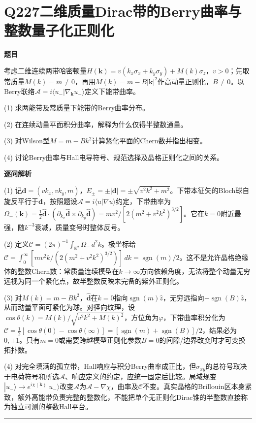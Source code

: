 \documentclass[UTF8,a4paper,11pt,oneside,openany]{ctexbook}
\begin{document}
\section*{Q227\quad 二维质量Dirac带的Berry曲率与整数量子化正则化}
\textbf{题目}\par
考虑二维连续两带哈密顿量$H(\boldsymbol k)=v(k_x\sigma_x+k_y\sigma_y)+M(k)\sigma_z$，$v>0$；先取常质量$M(k)=m\ne0$，再用$M(k)=m-B|\boldsymbol k|^2$作高动量正则化，$B\ne0$。以Berry联络$\mathcal A=i\langle u_-|\nabla_{\boldsymbol k}u_-\rangle$定义下能带曲率。
\par\smallskip\noindent (1) 求两能带及常质量下能带的Berry曲率分布。
\par\smallskip\noindent (2) 在连续动量平面积分曲率，解释为什么仅得半整数通量。
\par\smallskip\noindent (3) 对Wilson型$M=m-Bk^2$计算紧化平面的Chern数并指出相变。
\par\smallskip\noindent (4) 讨论Berry曲率与Hall电导符号、规范选择及晶格正则化之间的关系。
\par\medskip\textbf{逐问解析}\par
\par\smallskip\noindent (1) 记$\boldsymbol d=(vk_x,vk_y,m)$，$E_\pm=\pm|\boldsymbol d|=\pm\sqrt{v^2k^2+m^2}$。下带本征矢的Bloch球自旋反平行于$\boldsymbol d$，按照题设$\mathcal A=i\langle u|\nabla u\rangle$约定，下带曲率为$\Omega_-(\boldsymbol k)=\tfrac12\hat{\boldsymbol d}\cdot(\partial_{k_x}\hat{\boldsymbol d}\times\partial_{k_y}\hat{\boldsymbol d})=mv^2/[2(m^2+v^2k^2)^{3/2}]$。它在$k=0$附近最强，随$k^{-3}$衰减，质量变号时整体反号。
\par\smallskip\noindent (2) 定义$\mathcal C=(2\pi)^{-1}\int_{\mathbb R^2}\Omega_-\,d^2k$。极坐标给$\mathcal C=\int_0^\infty [mv^2k/(2(m^2+v^2k^2)^{3/2})]\,dk=\operatorname{sgn}(m)/2$。这不是允许晶格绝缘体的整数Chern数：常质量连续模型在$k\to\infty$方向依赖角度，无法将整个动量无穷远视为同一个紧化点，故半整数反映未完备的紫外正则化。
\par\smallskip\noindent (3) 对$M(k)=m-Bk^2$，$\hat{\boldsymbol d}$在$k=0$指向$\operatorname{sgn}(m)\hat z$，无穷远指向$-\operatorname{sgn}(B)\hat z$，从而动量平面可紧化为球。对径向纹理，设$\cos\theta(k)=M(k)/\sqrt{v^2k^2+M(k)^2}$，方位角为$\varphi$，下带曲率积分化为$\mathcal C=\frac12[\cos\theta(0)-\cos\theta(\infty)]=[\operatorname{sgn}(m)+\operatorname{sgn}(B)]/2$，结果必为$0,\pm1$。只有$m=0$或需要跨越模型正则化参数$B=0$的间隙/边界改变时才可变换拓扑数。
\par\smallskip\noindent (4) 对完全填满的孤立带，Hall响应与积分Berry曲率成正比，但$\sigma_{xy}$的总符号取决于电荷符号和所选$\mathcal A$、响应定义的约定，应统一固定后比较。局域规变$|u_-\rangle\to e^{i\chi(\boldsymbol k)}|u_-\rangle$改变$\mathcal A$为$\mathcal A-\nabla\chi$，曲率及$\mathcal C$不变。真实晶格的Brillouin区本身紧致，额外高能带负责完整的整数化，不能把单个无正则化Dirac锥的半整数直接称为独立可测的整数Hall平台。
\par\medskip\hrule\medskip
\end{document}
